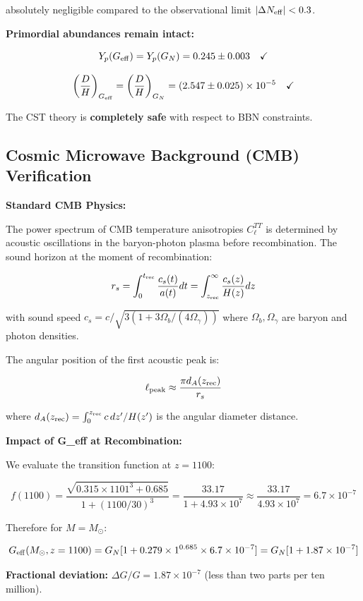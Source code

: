 \documentclass[11pt,a4paper]{article}
\begin{document}
absolutely negligible compared to the observational limit
\(|\Delta N_{\rm eff}| < 0.3\).

\textbf{Primordial abundances remain intact:}

\[Y_p(G_{\rm eff}) = Y_p(G_N) = 0.245 \pm 0.003 \quad \checkmark\]

\[\left(\frac{D}{H}\right)_{G_{\rm eff}} = \left(\frac{D}{H}\right)_{G_N} = (2.547 \pm 0.025) \times 10^{-5} \quad \checkmark\]

The CST theory is \textbf{completely safe} with respect to BBN
constraints.

\hypertarget{cosmic-microwave-background-cmb-verification}{%
\subsection{Cosmic Microwave Background (CMB)
Verification}\label{cosmic-microwave-background-cmb-verification}}

\textbf{Standard CMB Physics:}

The power spectrum of CMB temperature anisotropies \(C_\ell^{TT}\) is
determined by acoustic oscillations in the baryon-photon plasma before
recombination. The sound horizon at the moment of recombination:

\[r_s = \int_0^{t_{\rm rec}} \frac{c_s(t)}{a(t)} dt = \int_{z_{\rm rec}}^\infty \frac{c_s(z)}{H(z)} dz\]

with sound speed \(c_s = c/\sqrt{3(1 + 3\Omega_b/(4\Omega_\gamma))}\)
where \(\Omega_b, \Omega_\gamma\) are baryon and photon densities.

The angular position of the first acoustic peak is:

\[\ell_{\rm peak} \approx \frac{\pi d_A(z_{\rm rec})}{r_s}\]

where \(d_A(z_{\rm rec}) = \int_0^{z_{\rm rec}} c\, dz'/H(z')\) is the
angular diameter distance.

\textbf{Impact of G\_eff at Recombination:}

We evaluate the transition function at \(z = 1100\):

\[f(1100) = \frac{\sqrt{0.315 \times 1101^3 + 0.685}}{1 + (1100/30)^3} = \frac{33.17}{1 + 4.93\times10^7} \approx \frac{33.17}{4.93\times10^7} = 6.7 \times 10^{-7}\]

Therefore for \(M = M_\odot\):

\[G_{\rm eff}(M_\odot, z=1100) = G_N [1 + 0.279 \times 1^{0.685} \times 6.7\times10^{-7}] = G_N [1 + 1.87\times10^{-7}]\]

\textbf{Fractional deviation:} \(\Delta G/G = 1.87 \times 10^{-7}\)
(less than two parts per ten million).
\end{document}
